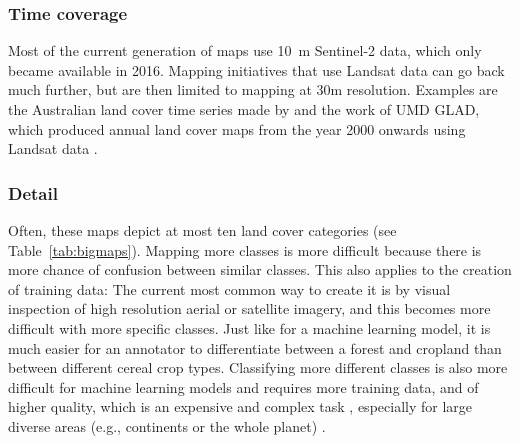     \subsubsection{Time coverage} 
        Most of the current generation of maps use 10~m Sentinel-2 data, which only became available in 2016. Mapping initiatives that use Landsat data can go back much further, but are then limited to mapping at 30m resolution. Examples are the Australian land cover time series made by \citep{calderon2021high} and the work of UMD GLAD, which produced annual land cover maps from the year 2000 onwards using Landsat data \citep{hansen2022global}. 

    \subsubsection{Detail}
        Often, these maps depict at most ten land cover categories (see Table~\ref{tab:bigmaps}). Mapping more classes is more difficult because there is more chance of confusion between similar classes. This also applies to the creation of training data: The current most common way to create it is by visual inspection of high resolution aerial or satellite imagery, and this becomes more difficult with more specific classes. Just like for a machine learning model, it is much easier for an annotator to differentiate between a forest and cropland than between different cereal crop types. Classifying more different classes is also more difficult for machine learning models and requires more training data, and of higher quality, which is an expensive and complex task \citep{li2021improving}, especially for large diverse areas (e.g., continents or the whole planet) \citep{tsendbazar2021towards,stanimirova2023global}. 

